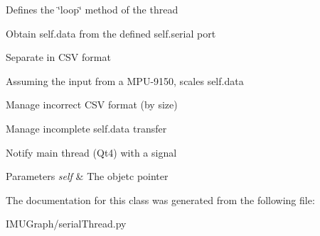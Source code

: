 Defines the \char`\"{}loop\char`\"{} method of the thread
\begin{DoxyItemize}
\item Obtain self.\-data from the defined self.\-serial port
\item Separate in C\-S\-V format
\item Assuming the input from a M\-P\-U-\/9150, scales self.\-data
\item Manage incorrect C\-S\-V format (by size)
\item Manage incomplete self.\-data transfer
\item Notify main thread (Qt4) with a signal 
\begin{DoxyParams}{Parameters}
{\em self} & The objetc pointer \\
\hline
\end{DoxyParams}

\end{DoxyItemize}

The documentation for this class was generated from the following file\-:\begin{DoxyCompactItemize}
\item 
I\-M\-U\-Graph/serial\-Thread.\-py\end{DoxyCompactItemize}
